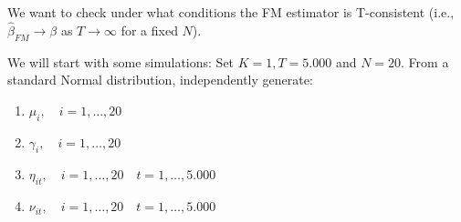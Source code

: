 \documentclass[12pt,twoside]{article}
\begin{document}
We want to check under what conditions the FM estimator is T-consistent (i.e., \(\widehat\beta_{FM} \to \beta\) as \(T\to\infty\) for a fixed \(N\)).

We will start with some simulations: Set \(K = 1, T = 5.000\) and \(N =20\). From a standard Normal distribution, independently generate:
\begin{enumerate}[label = \arabic*.]
    \item \(\mu_i, \quad i = 1, \dots, 20\)
    \item \(\gamma_i, \quad i = 1, \dots, 20\)
    \item \(\eta_{it}, \quad i = 1, \dots, 20 \quad t = 1, \dots, 5.000\)
    \item \(\nu_{it}, \quad i = 1, \dots, 20 \quad t = 1, \dots, 5.000\)
\end{enumerate}
\end{document}
